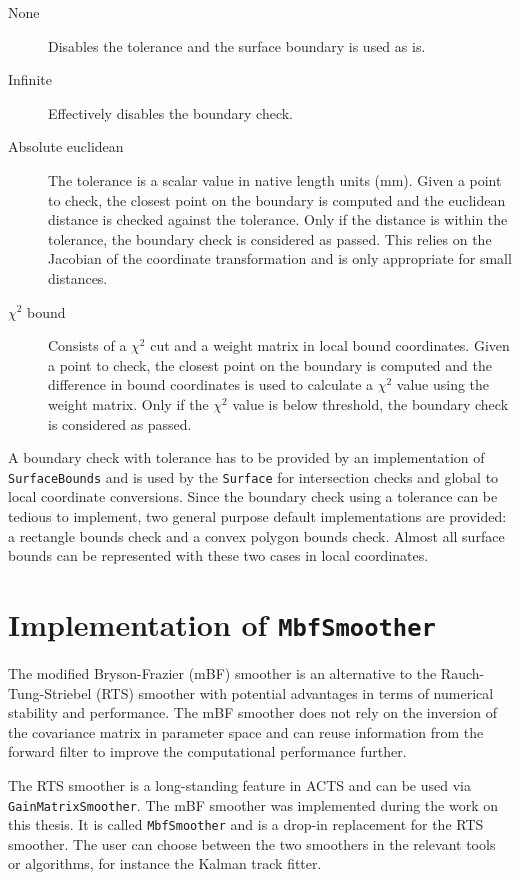 \begin{description}
    \item[None] Disables the tolerance and the surface boundary is used as is.
    \item[Infinite] Effectively disables the boundary check.
    \item[Absolute euclidean] The tolerance is a scalar value in native length units (mm). Given a point to check, the closest point on the boundary is computed and the euclidean distance is checked against the tolerance. Only if the distance is within the tolerance, the boundary check is considered as passed. This relies on the Jacobian of the coordinate transformation and is only appropriate for small distances.
    \item[$\chi^2$ bound] Consists of a $\chi^2$ cut and a weight matrix in local bound coordinates. Given a point to check, the closest point on the boundary is computed and the difference in bound coordinates is used to calculate a $\chi^2$ value using the weight matrix. Only if the $\chi^2$ value is below threshold, the boundary check is considered as passed.
\end{description}

A boundary check with tolerance has to be provided by an implementation of \texttt{SurfaceBounds} and is used by the \texttt{Surface} for intersection checks and global to local coordinate conversions. Since the boundary check using a tolerance can be tedious to implement, two general purpose default implementations are provided: a rectangle bounds check and a convex polygon bounds check. Almost all surface bounds can be represented with these two cases in local coordinates.

\section{Implementation of \texttt{MbfSmoother}}

The modified Bryson-Frazier (mBF) smoother \cite{mbf-smoother} is an alternative to the Rauch-Tung-Striebel (RTS) smoother \cite{rts-smoother} with potential advantages in terms of numerical stability and performance. The mBF smoother does not rely on the inversion of the covariance matrix in parameter space and can reuse information from the forward filter to improve the computational performance further.

The RTS smoother is a long-standing feature in ACTS and can be used via \texttt{GainMatrixSmoother}. The mBF smoother was implemented during the work on this thesis. It is called \texttt{MbfSmoother} and is a drop-in replacement for the RTS smoother. The user can choose between the two smoothers in the relevant tools or algorithms, for instance the Kalman track fitter.

